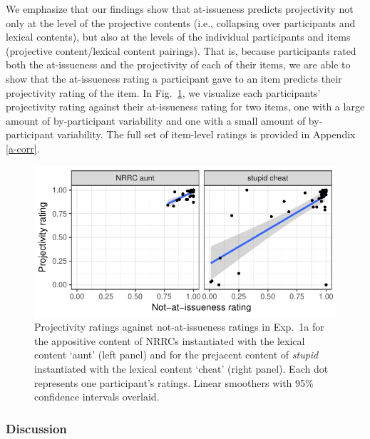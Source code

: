 \documentclass[11pt,fleqn]{article}
\newcommand{\6}{\mbox{$[\hspace*{-.6mm}[$}}
\newcommand{\9}{\mbox{$]\hspace*{-.6mm}]$}}
\newcommand{\figref}[1]{Fig.~\ref{#1}}
\begin{document}
We emphasize that our findings show that at-issueness predicts projectivity not only at the level of the projective contents (i.e., collapsing over participants and lexical contents), but also at the levels of the individual participants and items (projective content/lexical content pairings). That is, because participants rated both the at-issueness and the projectivity of each of their items, we are able to show that the at-issueness rating a participant gave to an item predicts their projectivity rating of 
the item. In \figref{f-ind-corr1a}, we visualize each participants' projectivity rating against their at-issueness rating for two items, one with a large amount of by-participant variability and one with a small amount of by-participant variability. The full set of item-level ratings is provided in Appendix \ref{a-corr}.


\begin{figure}[!h]
\begin{center}

\includegraphics[width=12cm]{../results/exp1a/graphs/subject-projai-examples}

\end{center}
\caption{Projectivity ratings against not-at-issueness ratings in Exp.~1a for the appositive content of NRRCs instantiated with the lexical content `aunt' (left panel) and for the prejacent content of {\em stupid} instantiated with the lexical content `cheat' (right panel). Each dot represents one participant's ratings. Linear smoothers with 95\% confidence intervals overlaid.}
\label{f-ind-corr1a}
\end{figure}

\subsubsection{Discussion}\label{s-discussion1a}
\end{document}
